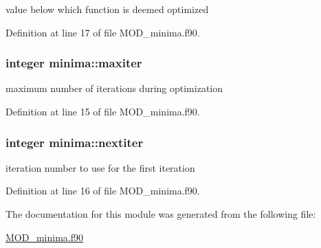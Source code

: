 value below which function is deemed optimized 



Definition at line 17 of file M\-O\-D\-\_\-minima.\-f90.

\hypertarget{classminima_a56beb25e4bab4444e6ca304089a30f4b}{
\subsubsection[{maxiter}]{\setlength{\rightskip}{0pt plus 5cm}integer minima\-::maxiter}}\label{classminima_a56beb25e4bab4444e6ca304089a30f4b}


maximum number of iterations during optimization 



Definition at line 15 of file M\-O\-D\-\_\-minima.\-f90.

\hypertarget{classminima_a9218f8d68c311e63bd9a3887ca9ef090}{
\subsubsection[{nextiter}]{\setlength{\rightskip}{0pt plus 5cm}integer minima\-::nextiter}}\label{classminima_a9218f8d68c311e63bd9a3887ca9ef090}


iteration number to use for the first iteration 



Definition at line 16 of file M\-O\-D\-\_\-minima.\-f90.



The documentation for this module was generated from the following file\-:\begin{DoxyCompactItemize}
\item 
\hyperlink{MOD__minima_8f90}{M\-O\-D\-\_\-minima.\-f90}\end{DoxyCompactItemize}
